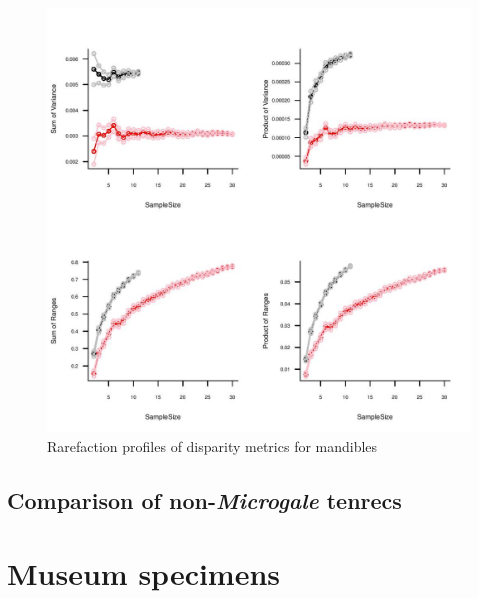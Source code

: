 \documentclass[12pt,a4paper]{article}
\begin{document}
\begin{figure}[H] 
  \centering
  \includegraphics{figures/mands_trc+gmole_PCrarefaction.jpg}
    \caption
    {Rarefaction profiles of disparity metrics for mandibles}%
  \label{fig:mands.rarefaction}
  \end{figure}
\subsection{Comparison of non-\textit{Microgale} tenrecs}


\section{Museum specimens}




\end{document}
